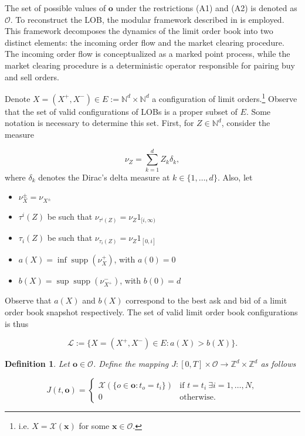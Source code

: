 \documentclass[10pt,a4paper,oneside]{article}
\newcommand{\N}{\mathbb{N}}
\newcommand{\Z}{\mathbb{Z}}
\newcommand{\Bo}{\mathcal{L}}
\newtheorem{definition}{Definition}
\DeclareMathOperator{\support}{supp}
\providecommand{\DIFaddbegin}{} %
\providecommand{\DIFaddend}{} %
\newcommand{\DIFaddincludegraphics}[2][]{{\color{blue}\fbox{\DIFOincludegraphics[#1]{#2}}}} %
\DeclareRobustCommand{\DIFaddbegin}{\DIFOaddbegin \let\includegraphics\DIFaddincludegraphics} %
\DeclareRobustCommand{\DIFaddend}{\DIFOaddend \let\includegraphics\DIFOincludegraphics} %
\begin{document}
The set of possible values of $\mathbf{o}$ under the restrictions (A1) and (A2) is denoted as $\mathcal{O}$. To reconstruct the LOB, the modular framework described in \cite{cont2023mathematical} is employed. This framework decomposes the dynamics of the limit order book into two distinct elements: the incoming order flow and the market clearing procedure. The incoming order flow is conceptualized as a marked point process, while the market clearing procedure is a deterministic operator responsible for pairing buy and sell orders.


Denote $X = (X^+, X^-) \in E := \N^d \times \N^d$ a configuration of limit orders.\footnote{i.e. $X = \mathcal{X}(\mathbf{x})$ for some $\mathbf{x} \in \mathcal{O}$.}  Observe that the set of valid configurations of LOBs is a proper subset of $E$. Some notation is necessary to determine this set. First, for $Z \in \N^d$, consider the measure 
\DIFaddbegin 

\DIFaddend $$
\nu_Z = \sum^d_{k = 1}Z_k \delta_k,
$$
where $\delta_k$ denotes the Dirac's delta measure at $k \in \{1, \dots, d \}$. Also, let
\DIFaddbegin 

\DIFaddend \begin{itemize}
    \item $\nu^{\pm}_X = \nu_{X^{\pm}}$
    \item $\tau^i(Z)$ be such that $\nu_{\tau^i(Z)} = \nu_Z 1_{[i, \infty)}$
    \item $\tau_i(Z)$ be such that $\nu_{\tau_i(Z)} = \nu_Z 1_{[0, i]}$
    \item $a(X) = \inf \support(\nu^+_{X})$, with $a(0) = 0$
    \item $b(X) = \sup \support(\nu^-_{X^+})$, with $b(0) = d$
\end{itemize}

Observe that $a(X)$ and $b(X)$ correspond to the best ask and bid of a limit order book snapshot respectively. The set of valid limit order book configurations is thus
\DIFaddbegin 

\DIFaddend $$
\Bo := \{X = (X^+, X^-) \in E : a(X) > b(X)\}.
$$

\begin{definition}
    Let $\mathbf{o} \in \mathcal{O}$. Define the mapping $J : [0, T] \times \mathcal{O} \rightarrow \Z^d \times \Z^d$ as follows
\DIFaddbegin 

    \DIFaddend \begin{equation*}
    J(t, \mathbf{o}) = \begin{cases}
        \mathcal{X}(\{ o \in \mathbf{o} : t_o = t_i  \}) & \text{if } t = t_{i} \ \exists  i = 1, \dots, N,\\
        0                        & \text{otherwise.}
    \end{cases}
\end{equation*}
    \DIFaddbegin 

\DIFaddend \end{definition}
\end{document}
